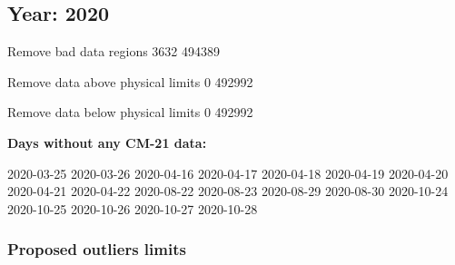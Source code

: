\documentclass[
  10pt,
  a4paper,oneside]{article}
\begin{document}
\FloatBarrier

\newpage

\hypertarget{year-2020}{%
\subsection{Year: 2020}\label{year-2020}}

Remove bad data regions
3632 494389

Remove data above physical limits
0 492992

Remove data below physical limits
0 492992

\textbf{Days without any CM-21 data:}

2020-03-25 2020-03-26 2020-04-16 2020-04-17 2020-04-18 2020-04-19 2020-04-20 2020-04-21 2020-04-22 2020-08-22 2020-08-23 2020-08-29 2020-08-30 2020-10-24 2020-10-25 2020-10-26 2020-10-27 2020-10-28

\hypertarget{proposed-outliers-limits-27}{%
\subsubsection{Proposed outliers limits}\label{proposed-outliers-limits-27}}

\footnotesize
\end{document}
